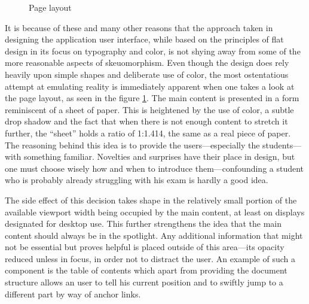 \documentclass[thesis=M,english,hidelinks]{FITthesis}[2012/10/20]
\begin{document}
\begin{figure}
  \setlength\fboxsep{0pt}
  \setlength\fboxrule{0.2pt}
  \caption{Page layout}
  \label{fig:page_layout}
\end{figure}

It is because of these and many other reasons that the approach taken in designing the application user interface, while based on the principles of flat design in its focus on typography and color, is not shying away from some of the more reasonable aspects of skeuomorphism. Even though the design does rely heavily upon simple shapes and deliberate use of color, the most ostentatious attempt at emulating reality is immediately apparent when one takes a look at the page layout, as seen in the figure \ref{fig:page_layout}. The main content is presented in a form reminiscent of a sheet of paper. This is heightened by the use of color, a subtle drop shadow and the fact that when there is not enough content to stretch it further, the ``sheet'' holds a ratio of 1:1.414, the same as a real piece of paper. The reasoning behind this idea is to provide the users---especially the students---with something familiar. Novelties and surprises have their place in design, but one must choose wisely how and when to introduce them---confounding a student who is probably already struggling with his exam is hardly a good idea.

The side effect of this decision takes shape in the relatively small portion of the available viewport width being occupied by the main content, at least on displays designated for desktop use. This further strengthens the idea that the main content should always be in the spotlight. Any additional information that might not be essential but proves helpful is placed outside of this area---its opacity reduced unless in focus, in order not to distract the user. An example of such a component is the table of contents which apart from providing the document structure allows an user to tell his current position and to swiftly jump to a different part by way of anchor links.
\end{document}

